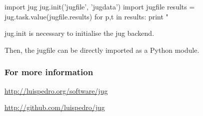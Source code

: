 \documentclass{beamer}
\begin{document}
\begin{frame}[fragile]
\begin{python}
import jug
jug.init('jugfile', 'jugdata')
import jugfile
results = jug.task.value(jugfile.results)
for p,t in results:
        print "%
\end{python}

\alert{jug.init} is necessary to initialise the jug backend.

Then, the \alert{jugfile can be directly imported as a Python module}.

\end{frame}

\begin{frame}[fragile]
\frametitle{For more information}

\href{http://luispedro.org/software/jug}{http://luispedro.org/software/jug}

\href{http://github.com/luispedro/jug}{http://github.com/luispedro/jug}
\end{frame}
\end{document}
